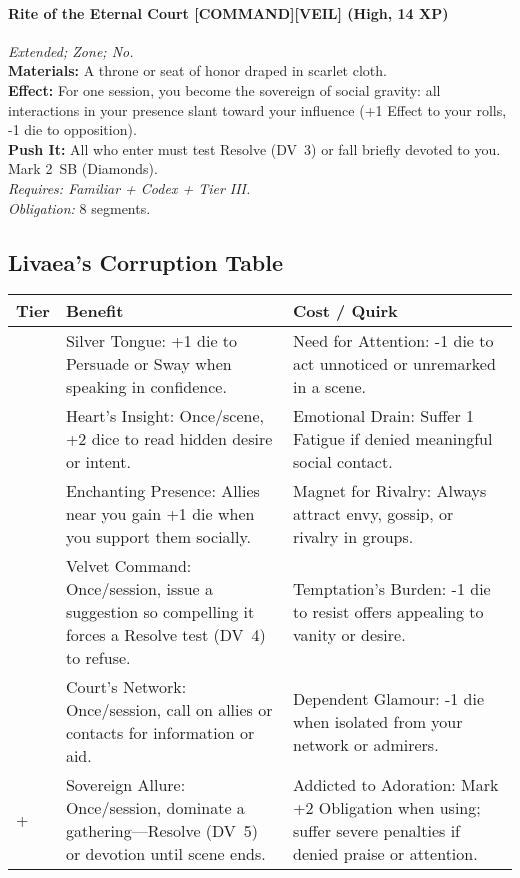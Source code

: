 \paragraph{Rite of the Eternal Court \textnormal{[COMMAND][VEIL]} (High, 14 XP)} \emph{Extended; Zone; No.}\\
\textbf{Materials:} A throne or seat of honor draped in scarlet cloth.\\
\textbf{Effect:} For one session, you become the sovereign of social gravity: all interactions in your presence slant toward your influence (+1 Effect to your rolls, -1 die to opposition).\\
\textbf{Push It:} All who enter must test Resolve (DV~3) or fall briefly devoted to you. Mark 2~SB (Diamonds).\\
\emph{Requires: Familiar + Codex + Tier III.}\\
\emph{Obligation:} 8 segments.

\subsection*{Livaea’s Corruption Table}
\label{sec:livaea-corruption}

\begin{longtable}{>{\raggedright\arraybackslash}p{1cm} p{5cm} p{5cm}}
\toprule
\textbf{Tier} & \textbf{Benefit} & \textbf{Cost / Quirk} \\
\midrule
1 & Silver Tongue: +1 die to Persuade or Sway when speaking in confidence. & Need for Attention: -1 die to act unnoticed or unremarked in a scene. \\
\midrule
2 & Heart’s Insight: Once/scene, +2 dice to read hidden desire or intent. & Emotional Drain: Suffer 1 Fatigue if denied meaningful social contact. \\
\midrule
3 & Enchanting Presence: Allies near you gain +1 die when you support them socially. & Magnet for Rivalry: Always attract envy, gossip, or rivalry in groups. \\
\midrule
4 & Velvet Command: Once/session, issue a suggestion so compelling it forces a Resolve test (DV~4) to refuse. & Temptation’s Burden: -1 die to resist offers appealing to vanity or desire. \\
\midrule
5 & Court’s Network: Once/session, call on allies or contacts for information or aid. & Dependent Glamour: -1 die when isolated from your network or admirers. \\
\midrule
6+ & Sovereign Allure: Once/session, dominate a gathering—Resolve (DV~5) or devotion until scene ends. & Addicted to Adoration: Mark +2 Obligation when using; suffer severe penalties if denied praise or attention. \\
\bottomrule
\end{longtable}
